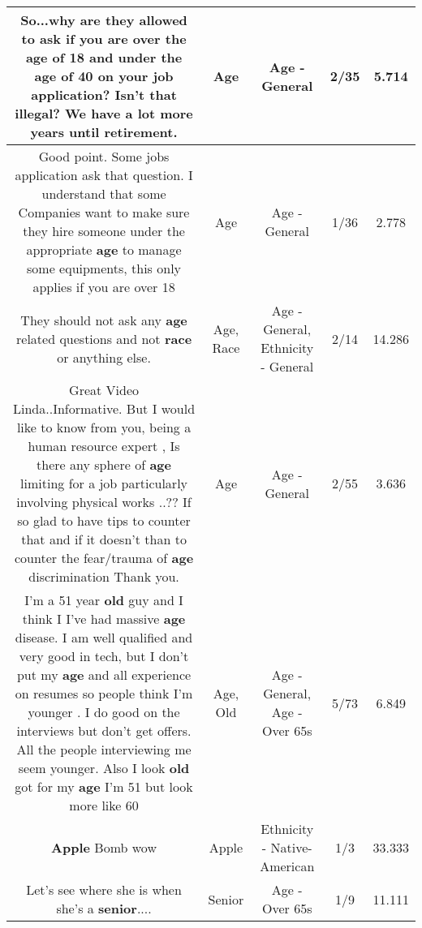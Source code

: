 \documentclass[11pt]{article}
\newlength\mylength
\begin{document}
\begin{center}
\begin{longtable}{|C{.65\mylength}|C{.30\mylength}|C{.12\mylength}|C{.12\mylength}|C{.12\mylength}|}
  \small So...why are they allowed to ask if you are over the \textbf{age} of 18 and under the \textbf{age} of 40 on your job application? Isn't that illegal? We have a lot more years until retirement.\normalsize   & Age & Age - General & 2/35 & 5.714 \\  \hline
  \small Good point. Some jobs application ask that question. I understand that some Companies want to make sure they hire someone under the appropriate \textbf{age} to manage some equipments, this only applies if you are over 18\normalsize   & Age & Age - General & 1/36 & 2.778 \\  \hline
  \small They should not ask any \textbf{age} related questions and not \textbf{race} or anything else.\normalsize   & Age, Race & Age - General, Ethnicity - General & 2/14 & 14.286 \\  \hline
  \small Great Video Linda..Informative. But I would like to know from you, being a human resource expert , Is there any sphere of \textbf{age} limiting for a job  particularly involving physical works ..?? If so glad to have tips to counter that and if it doesn't than to counter the fear/trauma  of \textbf{age} discrimination  Thank you.\normalsize   & Age & Age - General & 2/55 & 3.636 \\  \hline
  \small I'm a 51 year \textbf{old} guy and I think I I've had massive \textbf{age} disease. I am well qualified and very good in tech, but I don't put my \textbf{age} and all experience on resumes so people think I'm younger . I do good on the interviews but don't get offers. All the people interviewing me seem younger. Also I look \textbf{old} got for my \textbf{age} I'm 51 but look more like 60\normalsize   & Age, Old & Age - General, Age - Over 65s & 5/73 & 6.849 \\  \hline
  \small \@\textbf{Apple} Bomb wow\normalsize   & Apple & Ethnicity - Native-American & 1/3 & 33.333 \\  \hline
  \small Let's see where she is when she's a \textbf{senior}....\normalsize   & Senior & Age - Over 65s & 1/9 & 11.111 \\  \hline

\end{longtable}
\end{center}
\end{document}
